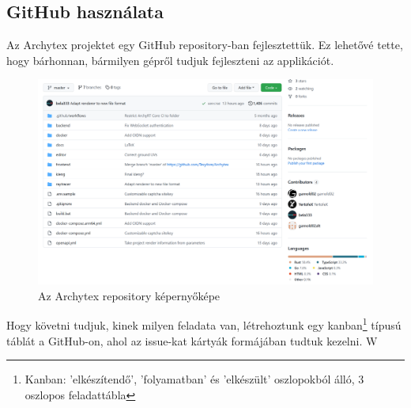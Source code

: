 \subsection{GitHub használata}
Az Archytex projektet egy GitHub repository-ban fejlesztettük. Ez lehetővé tette, hogy bárhonnan, bármilyen gépről tudjuk fejleszteni az applikációt.

\begin{figure}[h]
  \centering
  \includegraphics[width=.9\textwidth]{parts/developer-documentation/work/images/repository.png}
  \caption{Az Archytex repository képernyőképe}
\end{figure}

Hogy követni tudjuk, kinek milyen feladata van, létrehoztunk egy kanban\footnote{Kanban: 'elkészítendő', 'folyamatban' és 'elkészült' oszlopokból álló, 3 oszlopos feladattábla} típusú táblát a GitHub-on, ahol az issue-kat kártyák formájában tudtuk kezelni. W